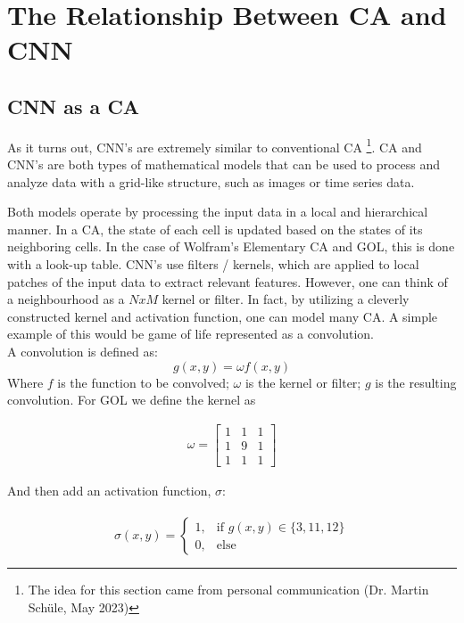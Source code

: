 \section{The Relationship Between CA and CNN}
\label{ca-cnn}
\subsection{CNN as a CA}
As it turns out, CNN's are extremely similar to conventional CA \footnote{The idea for this section came from personal communication (Dr. Martin Schüle, May 2023)}. CA and CNN's are both types of mathematical models that can be used to process and analyze data with a grid-like structure, such as images or time series data. \cite{PhysRevE}

Both models operate by processing the input data in a local and hierarchical manner. In a CA, the state of each cell is updated based on the states of its neighboring cells. In the case of Wolfram's Elementary CA and GOL, this is done with a look-up table. CNN's use filters / kernels, which are applied to local patches of the input data to extract relevant features. However, one can think of a neighbourhood as a $NxM$ kernel or filter. In fact, by utilizing a cleverly constructed kernel and activation function, one can model many CA. A simple example of this would be game of life represented as a convolution. \\

A convolution is defined as: \\

\begin{equation*}
	g(x,y) = \omega f(x, y)
\end{equation*}
Where $f$ is the function to be convolved; $\omega$ is the kernel or filter; $g$ is the resulting convolution. For GOL we define the kernel as

\begin{gather*}
	\omega = 
	\begin{bmatrix}
		1 & 1 & 1 \\
		1 & 9 & 1 \\
		1 & 1 & 1
	\end{bmatrix}
\end{gather*}


And then add an activation function, $\sigma$: \\ \\

\begin{equation}
	\sigma(x, y) = \begin{cases}
		1, & \text{if } g(x, y) \in \{3, 11, 12\} \\
		0, & \text{else}
	\end{cases}
\end{equation}

